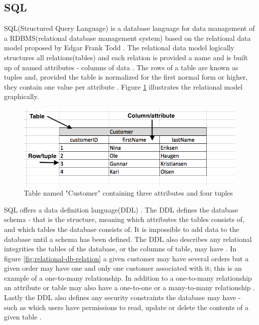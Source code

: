 \subsection{SQL} 
SQL(Structured Query Language) is a database language for data management\cite{sql-goal} of a RDBMS(relational database management system) \cite{sql-is-a-rdbms} based on the relational data model proposed by Edgar Frank Todd \cite{rdbms}.
The relational data model logically structures all relations(tables) and each relation is provided a name and is built up of named attributes - columns of data \cite{sql-is-a-rdbms}.
The rows of a table are known as tuples \cite{sql-is-a-rdbms} and, provided the table is normalized for the first normal form or higher, they contain one value per attribute \cite{sql-1nf}.
Figure \ref{fig:relational-db-visualised} illustrates the relational model graphically.

\begin{figure}
    \centering
    \includegraphics[width=115mm,scale=1]{figures/relational-db-visualised.png}
    \caption{Table named "Customer" containing three attributes and four tuples}
    \label{fig:relational-db-visualised}
\end{figure}

SQL offers a data definition language(DDL) \cite{sql-components}.
The DDL defines the database schema - that is the structure, meaning which attributes the tables consists of, and which tables the database consists of.
It is impossible to add data to the database until a schema has been defined.
The DDL also describes any relational integrities the tables of the database, or the columns of table, may have \cite{sql-constraints}.
In figure \ref{fig:relational-db-relation} a given customer may have several orders but a given order may have one and only one customer associated with it; this is an example of a one-to-many relationship.
In addition to a one-to-many relationship an attribute or table may also have a one-to-one or a many-to-many relationship \cite{sql-relationships}.
Lastly the DDL also defines any security constraints the database may have - such as which users have permissions to read, update or delete the contents of a given table \cite{sql-ddl}.

